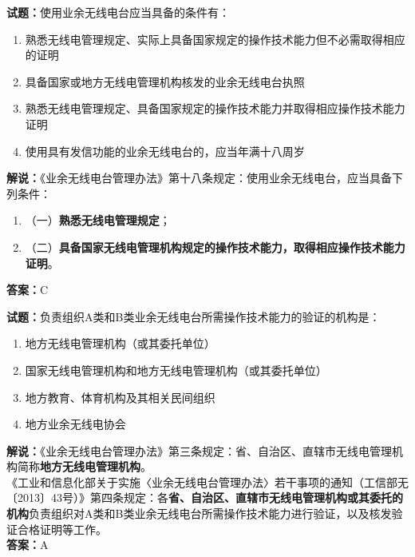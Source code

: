 \documentclass{ctexbook}
\begin{document}
\noindent\textbf{试题：}使用业余无线电台应当具备的条件有：
\begin{enumerate}[leftmargin=3em]
	\item 熟悉无线电管理规定、实际上具备国家规定的操作技术能力但不必需取得相应的证明
	\item 具备国家或地方无线电管理机构核发的业余无线电台执照
	\item 熟悉无线电管理规定、具备国家规定的操作技术能力并取得相应操作技术能力证明
	\item 使用具有发信功能的业余无线电台的，应当年满十八周岁
\end{enumerate}
\noindent\textbf{解说：}《业余无线电台管理办法》第十八条规定：使用业余无线电台，应当具备下列条件：
\begin{enumerate}[label=, leftmargin=1em]
	\item（一）\textbf{熟悉无线电管理规定}；
	\item（二）\textbf{具备国家无线电管理机构规定的操作技术能力，取得相应操作技术能力证明}。
\end{enumerate}
\noindent\textbf{答案：}C



\bigskip


\noindent\textbf{试题：}负责组织A类和B类业余无线电台所需操作技术能力的验证的机构是：
\begin{enumerate}[leftmargin=3em]
	\item 地方无线电管理机构（或其委托单位）
	\item 国家无线电管理机构和地方无线电管理机构（或其委托单位）
	\item 地方教育、体育机构及其相关民间组织
	\item 地方业余无线电协会
\end{enumerate}
\noindent\textbf{解说：}《业余无线电台管理办法》第三条规定：省、自治区、直辖市无线电管理机构简称\textbf{地方无线电管理机构}。\\
《工业和信息化部关于实施〈业余无线电台管理办法〉若干事项的通知（工信部无〔2013〕43号）》第四条规定：各\textbf{省、自治区、直辖市无线电管理机构或其委托的机构}负责组织对A类和B类业余无线电台所需操作技术能力进行验证，以及核发验证合格证明等工作。\\\noindent\textbf{答案：}A



\bigskip
\end{document}
